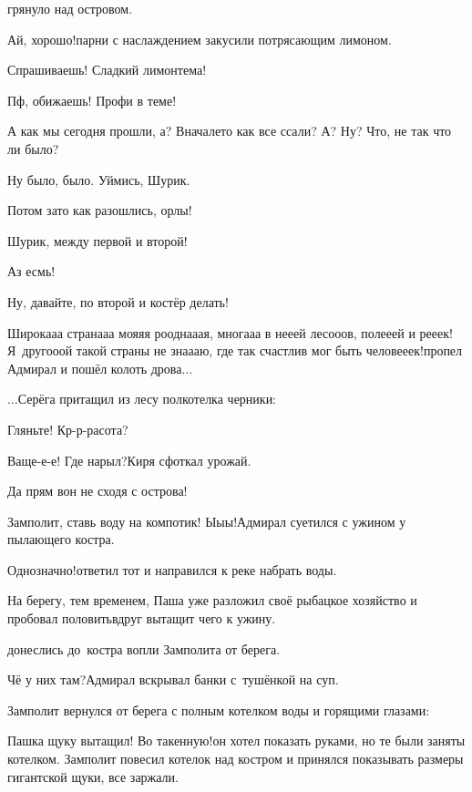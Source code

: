 \mdash грянуло над островом.

\diagdash Ай, хорошо!\mdash парни с наслаждением закусили потрясающим лимоном.

\diagdash Спрашиваешь! Сладкий лимон\mdash тема!

\diagdash Пф, обижаешь! Профи в теме!

\diagdash А как мы сегодня прошли, а? Вначале\sdash то как все ссали? А? Ну? Что, не так что ли было?

\diagdash Ну было, было. Уймись, Шурик.

\diagdash Потом зато как разошлись, орлы!

\diagdash Шурик, между первой и второй!

\diagdash Аз есмь!

\diagdash Ну, давайте, по второй и костёр делать!

\diagdash Широка\sdash а\sdash а страна\sdash а\sdash а моя\sdash я\sdash я роодна\sdash а\sdash ая, многа\sdash а\sdash а в не\sdash е\sdash ей лесо\sdash о\sdash ов, поле\sdash е\sdash ей и ре\sdash е\sdash ек! Я~друго\sdash о\sdash ой такой страны не зна\sdash а\sdash аю, где так счастлив мог быть челове\sdash е\sdash ек!\mdash пропел Адмирал и пошёл колоть дрова$\ldots$

\vspace{0.5cm} 
$\ldots$Серёга притащил из лесу полкотелка черники:

\diagdash Гляньте! Кр-р-расота?

\diagdash Ваще-е-е! Где нарыл?\mdash Киря сфоткал урожай.

\diagdash Да прям вон не сходя с острова!

\diagdash Замполит, ставь воду на компотик! Ы\sdash ы\sdash ы!\mdash Адмирал суетился с ужином у пылающего костра.

\diagdash Однозначно!\mdash ответил тот и направился к реке набрать воды.

На берегу, тем временем, Паша уже разложил своё рыбацкое хозяйство и пробовал половить\mdash вдруг вытащит чего к ужину. 

\mdash донеслись до~костра вопли Замполита от берега.

\diagdash Чё у них там?\mdash Адмирал вскрывал банки с~тушёнкой на суп.

Замполит вернулся от берега с полным котелком воды и горящими глазами:

\diagdash Пашка щуку вытащил! Во такенную!\mdash он хотел показать руками, но те были заняты котелком. Замполит повесил котелок над костром и принялся показывать размеры гигантской щуки, все заржали.


